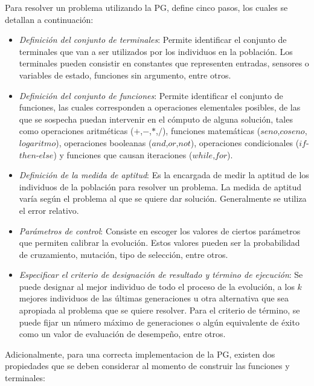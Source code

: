 
Para resolver un problema utilizando la PG, \cite{koza_1992} define cinco pasos, los cuales se detallan a continuación:

\begin{itemize}
	\item \textit{Definición del conjunto de terminales}: Permite identificar el conjunto de terminales que van a ser utilizados por los individuos en la población. Los terminales pueden consistir en constantes que representen entradas, sensores o variables de estado, funciones sin argumento, entre otros.

	\item \textit{Definición del conjunto de funciones}: Permite identificar el conjunto de funciones, las cuales corresponden a operaciones elementales posibles, de las que se sospecha puedan intervenir en el cómputo de alguna solución, tales como operaciones aritméticas ($+$,$-$,$*$,$/$), funciones matemáticas ($seno$,$coseno$,$logaritmo$), operaciones booleanas ($and$,$or$,$not$), operaciones condicionales ($if$-$then$-$else$) y funciones que causan iteraciones ($while$,$for$).

	\item \textit{Definición de la medida de aptitud}: Es la encargada de medir la aptitud de los individuos de la población para resolver un problema. La medida de aptitud varía según el problema al que se quiere dar solución. Generalmente se utiliza el error relativo.

	\item \textit{Parámetros de control}: Consiste en escoger los valores de ciertos parámetros que permiten calibrar la evolución. Estos valores pueden ser la probabilidad de cruzamiento, mutación, tipo de selección, entre otros.

	\item \textit{Especificar el criterio de designación de resultado y término de ejecución}: Se puede designar al mejor individuo de todo el proceso de la evolución, a los $k$ mejores individuos de las últimas generaciones u otra alternativa que sea apropiada al problema que se quiere resolver. Para el criterio de término, se puede fijar un número máximo de generaciones o algún equivalente de éxito como un valor de evaluación de desempeño, entre otros.
\end{itemize}



Adicionalmente, para una correcta implementacion de la PG, existen dos propiedades que se deben considerar al momento de construir las funciones y terminales:

